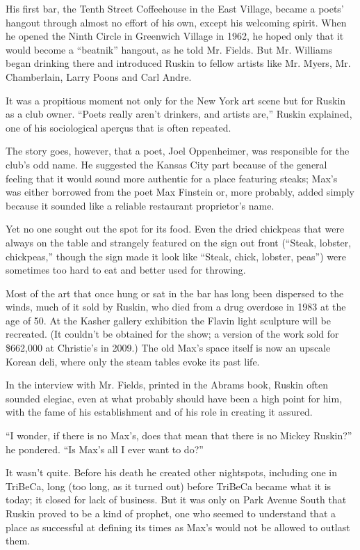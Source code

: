 His first bar, the Tenth Street Coffeehouse in the East Village, became
a poets' hangout through almost no effort of his own, except his
welcoming spirit. When he opened the Ninth Circle in Greenwich Village
in 1962, he hoped only that it would become a ``beatnik'' hangout, as he
told Mr. Fields. But Mr. Williams began drinking there and introduced
Ruskin to fellow artists like Mr. Myers, Mr. Chamberlain, Larry Poons
and Carl Andre.

It was a propitious moment not only for the New York art scene but for
Ruskin as a club owner. ``Poets really aren't drinkers, and artists
are,'' Ruskin explained, one of his sociological aperçus that is often
repeated.

The story goes, however, that a poet, Joel Oppenheimer, was responsible
for the club's odd name. He suggested the Kansas City part because of
the general feeling that it would sound more authentic for a place
featuring steaks; Max's was either borrowed from the poet Max Finstein
or, more probably, added simply because it sounded like a reliable
restaurant proprietor's name.

Yet no one sought out the spot for its food. Even the dried chickpeas
that were always on the table and strangely featured on the sign out
front (``Steak, lobster, chickpeas,'' though the sign made it look like
``Steak, chick, lobster, peas'') were sometimes too hard to eat and
better used for throwing.

Most of the art that once hung or sat in the bar has long been dispersed
to the winds, much of it sold by Ruskin, who died from a drug overdose
in 1983 at the age of 50. At the Kasher gallery exhibition the Flavin
light sculpture will be recreated. (It couldn't be obtained for the
show; a version of the work sold for \$662,000 at Christie's in 2009.)
The old Max's space itself is now an upscale Korean deli, where only the
steam tables evoke its past life.

In the interview with Mr. Fields, printed in the Abrams book, Ruskin
often sounded elegiac, even at what probably should have been a high
point for him, with the fame of his establishment and of his role in
creating it assured.

``I wonder, if there is no Max's, does that mean that there is no Mickey
Ruskin?'' he pondered. ``Is Max's all I ever want to do?''

It wasn't quite. Before his death he created other nightspots, including
one in TriBeCa, long (too long, as it turned out) before TriBeCa became
what it is today; it closed for lack of business. But it was only on
Park Avenue South that Ruskin proved to be a kind of prophet, one who
seemed to understand that a place as successful at defining its times as
Max's would not be allowed to outlast them.

